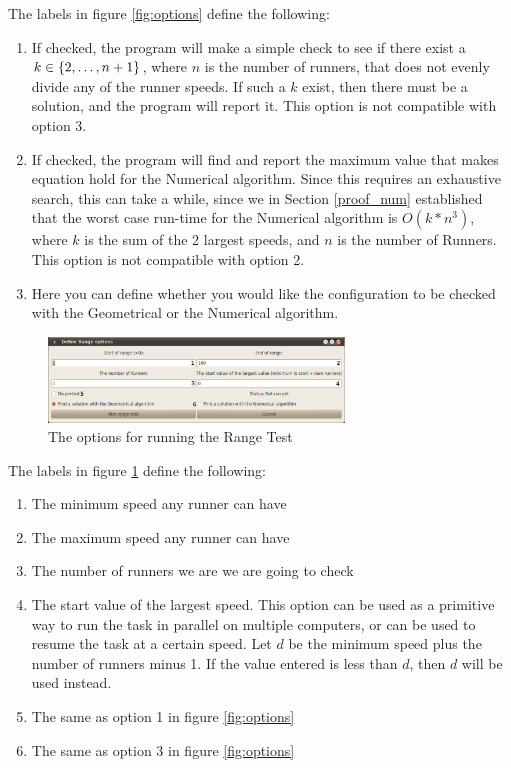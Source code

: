 The labels in figure \ref{fig:options} define the following:
\begin{enumerate}
\item If checked, the program will make a simple check to see if there exist a $k \in \{2, \ldots, n+1\}$, where $n$ is the number of runners, that does not evenly divide any of the runner speeds. If such a $k$ exist, then there must be a solution, and the program will report it. This option is not compatible with option 3.
\item If checked, the program will find and report the maximum value that makes equation  hold for the Numerical algorithm. Since this requires an exhaustive search, this can take a while, since we in Section \ref{proof_num} established that the worst case run-time for the Numerical algorithm is $O(k * n^3)$, where $k$ is the sum of the 2 largest speeds, and $n$ is the number of Runners. This option is not compatible with option 2.
\item Here you can define whether you would like the configuration to be checked with the Geometrical or the Numerical algorithm.
\end{enumerate}

\begin{figure}[H]
  \centering
  \includegraphics[width=0.70\textwidth]{./images/Range_Options}
  \caption{\label{fig:range_options}The options for running the Range Test}
\end{figure}

The labels in figure \ref{fig:range_options} define the following:
\begin{enumerate}
\item The minimum speed any runner can have 
\item The maximum speed any runner can have
\item The number of runners we are we are going to check
\item The start value of the largest speed. This option can be used as a primitive way to run the task in parallel on multiple computers, or can be used to resume the task at a certain speed. Let $d$ be the minimum speed plus the number of runners minus 1. If the value entered is less than $d$, then $d$ will be used instead.
\item The same as option 1 in figure \ref{fig:options}
\item The same as option 3 in figure \ref{fig:options}
\end{enumerate}

